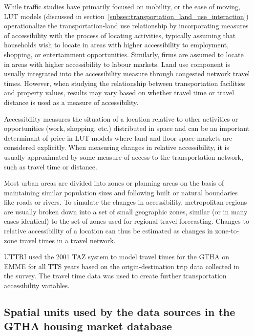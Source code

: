 While traffic studies have primarily focused on mobility, or the ease of moving,
LUT models (discussed in section~\ref{subsec:transportation_land_use_interaction}) operationalize the transportation-land use relationship by incorporating measures of accessibility with the process of locating activities, typically assuming that households wish to locate in areas with higher accessibility to employment, shopping, or entertainment opportunities.
Similarly, firms are assumed to locate in areas with higher accessibility to labour markets.
Land use component is usually integrated into the accessibility measure through congested network travel times.
However, when studying the relationship between transportation facilities and property values, results may vary based on whether travel time or travel distance is used as a measure of accessibility\cite{Sherry1999}.

Accessibility measures the situation of a location relative to other activities or opportunities (work, shopping, etc.) distributed in space and can be an important determinant of price in LUT models where land and floor space markets are considered explicitly\cite{Iacono2008}.
When measuring changes in relative accessibility, it is usually approximated by some measure of access to the transportation network, such as travel time or distance.

Most urban areas are divided into zones or planning areas on the basis of maintaining similar population sizes and following built or natural boundaries like roads or rivers.
To simulate the changes in accessibility, metropolitan regions are usually broken down into a set of small geographic zones, similar (or in many cases identical) to the set of zones used for regional travel forecasting.
Changes to relative accessibility of a location can thus be estimated as changes in zone-to-zone travel times in a travel network\cite{Iacono2008}.

UTTRI used the 2001 TAZ system to model travel times for the GTHA on EMME for all TTS years based on the origin-destination trip data collected in the survey.
The travel time data was used to create further transportation accessibility variables.

\subsection{Spatial units used by the data sources in the GTHA housing market database} \label{subsec:spatial_units_used_in_database}

